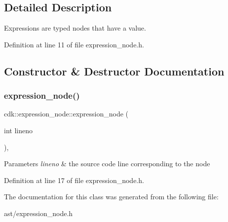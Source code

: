 \subsection{Detailed Description}
Expressions are typed nodes that have a value. 

Definition at line 11 of file expression\+\_\+node.\+h.



\subsection{Constructor \& Destructor Documentation}
\mbox{\label{classcdk_1_1expression__node_a026555785146a09f2d53d56e1bb1e984}} 
\subsubsection{expression\+\_\+node()}
{\footnotesize\ttfamily cdk\+::expression\+\_\+node\+::expression\+\_\+node (\begin{DoxyParamCaption}\item[{int}]{lineno }\end{DoxyParamCaption})\hspace{0.3cm}{\ttfamily [inline]}, {\ttfamily [protected]}}


\begin{DoxyParams}{Parameters}
{\em lineno} & the source code line corresponding to the node \\
\hline
\end{DoxyParams}


Definition at line 17 of file expression\+\_\+node.\+h.



The documentation for this class was generated from the following file\+:\begin{DoxyCompactItemize}
\item 
ast/expression\+\_\+node.\+h\end{DoxyCompactItemize}
